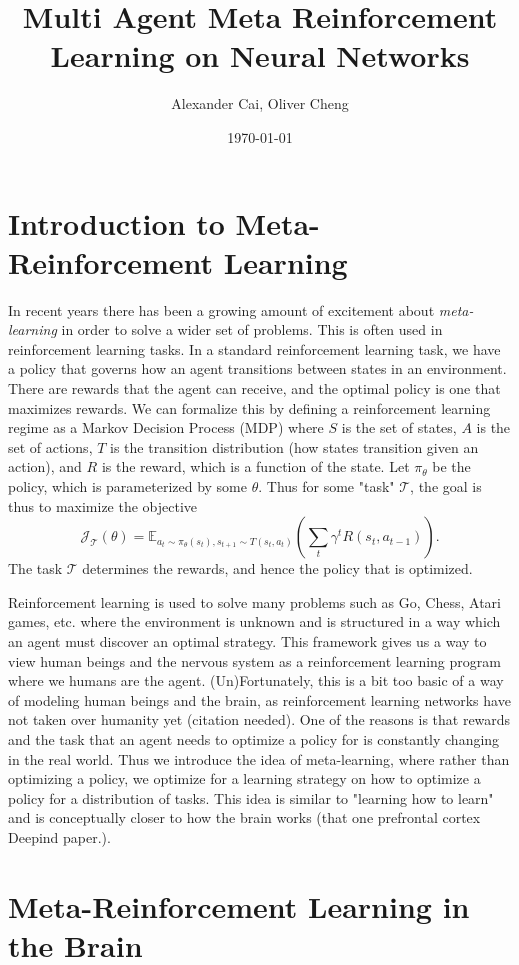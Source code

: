 \documentclass[11pt,letterpaper]{article}
\author{Alexander Cai, Oliver Cheng}
\date{\today}
\title{Multi Agent Meta Reinforcement Learning on Neural Networks}
\begin{document}
\maketitle
\section{Introduction to Meta-Reinforcement Learning}
In recent years there has been a growing amount of excitement about 
\textit{meta-learning} in order to solve a wider set of problems. This is 
often used in reinforcement learning tasks. In a standard reinforcement
 learning task, we have a policy that governs how an agent transitions 
between states in an environment. There are rewards that the agent can 
receive, and the optimal policy is one that maximizes rewards. We can 
formalize this by defining a reinforcement learning regime as a Markov 
Decision Process (MDP) where $S$ is the set of states, $A$ is the set 
of actions, $T$ is the transition distribution (how states transition given 
an action), and $R$ is the reward, which is a function of the state. Let 
$\pi_\theta$ be the policy, which is parameterized by some $\theta$. 
Thus for some "task" $\mathcal{T}$, the goal is thus to maximize the objective 
\[ \mathcal{J}_{\mathcal{T}}(\theta) = \mathbb{E}_{a_t \sim \pi_\theta(s_t), s_{t+1}
 \sim T(s_t, a_t)} \left( \sum_t \gamma^t R(s_t, a_{t-1}) \right).\]
The task $\mathcal{T}$ determines the rewards, and hence the policy that is optimized. 

Reinforcement learning is used to solve many problems such as Go, Chess, 
Atari games, etc. where the environment is unknown and is structured in 
a way which an agent must discover an optimal strategy. This framework 
gives us a way to view human beings and the nervous system as a 
reinforcement learning program where we humans are the agent. 
(Un)Fortunately, this is a bit too basic of a way of modeling human 
beings and the brain, as reinforcement learning networks have not taken 
over humanity yet (citation needed). One of the reasons is that rewards 
and the task that an agent needs to optimize a policy for is constantly 
changing in the real world. Thus we introduce the idea of meta-learning, 
where rather than optimizing a policy, we optimize for a learning strategy 
on how to optimize a policy for a distribution of tasks. This idea is similar 
to "learning how to learn" and is conceptually closer to how the brain 
works (that one prefrontal cortex Deepind paper.). 

\section{Meta-Reinforcement Learning in the Brain}
\end{document}
